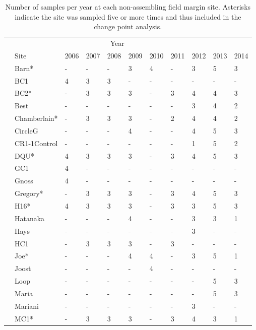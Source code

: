 \documentclass[12pt]{article}
\begin{document}
\begin{table}
  \renewcommand*\arraystretch{1.25}
  \centering
  \caption{Number of samples per year at each non-assembling field
    margin site. Asterisks indicate the site was sampled five or more times
    and thus included in the change point analysis.} 
  \begin{tabular}{lllllllllll}
    \hline
    \multicolumn{10}{c}{\hspace{10em}Year}\\
    & Site & 2006 & 2007 & 2008 & 2009 & 2010 & 2011 & 2012 & 2013 & 2014\\
    \hline
    &Barn* & - & - & - & 3 & 4 & - & 3 & 5 & 3\\
    &BC1 & 4 & 3 & 3 & - & - & - & - & - & -\\
    &BC2* & - & 3 & 3 & 3 & - & 3 & 4 & 4 & 3\\
    &Best & - & - & - & - & - & - & 3 & 4 & 2\\
    &Chamberlain* & - & 3 & 3 & 3 & - & 2 & 4 & 4 & 2\\
    &CircleG & - & - & - & 4 & - & - & 4 & 5 & 3\\
    &CR1-1Control & - & - & - & - & - & - & 1 & 5 & 2\\
    &DQU* & 4 & 3 & 3 & 3 & - & 3 & 4 & 5 & 3\\
    &GC1 & 4 & - & - & - & - & - & - & - & -\\
    &Gnoss & 4 & - & - & - & - & - & - & - & -\\
    &Gregory* & - & 3 & 3 & 3 & - & 3 & 4 & 5 & 3\\
    &H16* & 4 & 3 & 3 & 3 & - & 3 & 3 & 5 & 3\\
    &Hatanaka & - & - & - & 4 & - & - & 3 & 3 & 1\\
    &Hays & - & - & - & - & - & - & 3 & - & -\\
    &HC1 & - & 3 & 3 & 3 & - & 3 & - & - & -\\
    &Joe* & - & - & - & 4 & 4 & - & 3 & 5 & 1\\
    &Joost & - & - & - & - & 4 & - & - & - & -\\
    &Loop & - & - & - & - & - & - & - & 5 & 3\\
    &Maria & - & - & - & - & - & - & - & 5 & 3\\
    &Mariani & - & - & - & - & - & - & 3 & - & -\\
    &MC1* & - & 3 & 3 & 3 & - & 3 & 4 & 3 & 1\\

\end{tabular}
\end{table}
\end{document}
